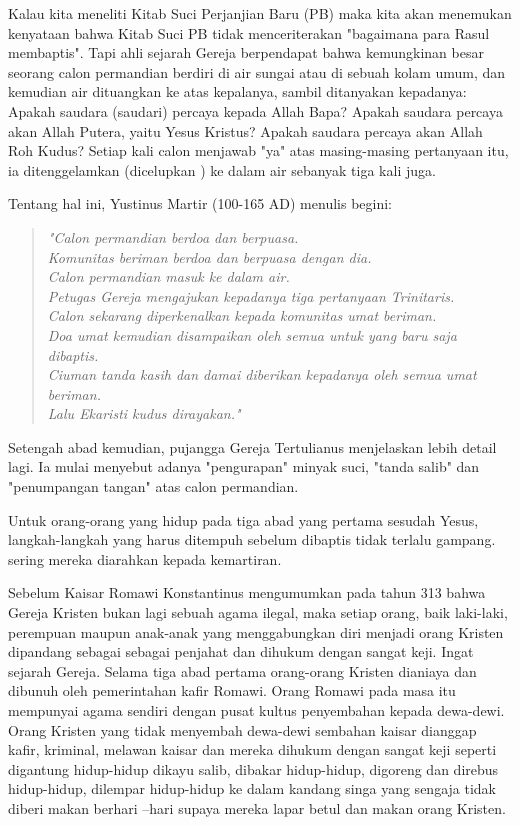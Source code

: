     Kalau kita meneliti Kitab Suci Perjanjian Baru (PB) maka kita akan menemukan kenyataan bahwa Kitab Suci PB tidak menceriterakan "bagaimana para Rasul membaptis". Tapi ahli sejarah Gereja berpendapat bahwa kemungkinan besar seorang calon permandian berdiri di air sungai atau di sebuah kolam umum, dan kemudian air dituangkan ke atas kepalanya, sambil ditanyakan kepadanya: Apakah saudara (saudari) percaya kepada Allah Bapa? Apakah saudara percaya akan Allah Putera, yaitu Yesus Kristus? Apakah saudara percaya akan Allah Roh Kudus? Setiap kali calon menjawab "ya" atas masing-masing pertanyaan itu, ia ditenggelamkan (dicelupkan ) ke dalam air sebanyak tiga kali juga.

    Tentang hal ini, Yustinus Martir (100-165 AD) menulis begini:

\small
\begin{quote}\textit{
    "Calon permandian berdoa dan berpuasa.\\
    Komunitas beriman berdoa dan berpuasa dengan dia.\\
    Calon permandian masuk ke dalam air.\\
    Petugas Gereja mengajukan kepadanya tiga pertanyaan Trinitaris.\\
    Calon sekarang diperkenalkan kepada komunitas umat beriman.\\
    Doa umat kemudian disampaikan oleh semua untuk yang baru saja dibaptis.\\
    Ciuman tanda kasih dan damai diberikan kepadanya oleh semua umat beriman.\\
    Lalu Ekaristi kudus dirayakan."}
\end{quote}
\normalsize

    Setengah abad kemudian, pujangga Gereja Tertulianus menjelaskan lebih detail lagi. Ia mulai menyebut adanya "pengurapan" minyak suci, "tanda salib" dan "penumpangan tangan" atas calon permandian.

    Untuk orang-orang yang hidup pada tiga abad yang pertama sesudah Yesus, langkah-langkah yang harus ditempuh sebelum dibaptis tidak terlalu gampang. sering mereka diarahkan kepada kemartiran.

    Sebelum Kaisar Romawi Konstantinus mengumumkan pada tahun 313 bahwa Gereja Kristen bukan lagi sebuah agama ilegal, maka setiap orang, baik laki-laki, perempuan maupun anak-anak yang menggabungkan diri menjadi orang Kristen dipandang sebagai sebagai penjahat dan dihukum dengan sangat keji. Ingat sejarah Gereja. Selama tiga abad pertama orang-orang Kristen dianiaya dan dibunuh oleh pemerintahan kafir Romawi. Orang Romawi pada masa itu mempunyai agama sendiri dengan pusat kultus penyembahan kepada dewa-dewi. Orang Kristen yang tidak menyembah dewa-dewi sembahan kaisar dianggap kafir, kriminal, melawan kaisar dan mereka dihukum dengan sangat keji seperti digantung hidup-hidup dikayu salib, dibakar hidup-hidup, digoreng dan direbus hidup-hidup, dilempar hidup-hidup ke dalam kandang singa yang sengaja tidak diberi makan berhari –hari supaya mereka lapar betul dan makan orang Kristen.

